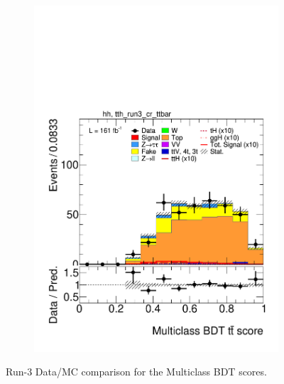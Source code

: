 \begin{figure}[htbp]
\begin{subfigure}[b]{0.49\textwidth}
  \end{subfigure}
  \hfill
  \begin{subfigure}[b]{0.49\textwidth}
    \centering
    \includegraphics[width=\textwidth]{images/plots_modelling_run2_run3_variables/run_3_tth/plot_tth_th_multiclass_ttbar_hh_tth_run3_cr_ttbar_22_23_24.pdf}
    \caption{}

  \end{subfigure}

  \caption{Run-3 Data/MC comparison for the Multiclass BDT scores.}
  \label{scores_modelling_3}
\end{figure}


